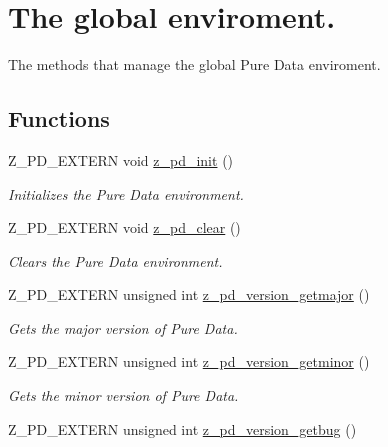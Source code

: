 \hypertarget{group__enviroment}{\section{The global enviroment.}
\label{group__enviroment}
}


The methods that manage the global Pure Data enviroment.  


\subsection*{Functions}
\begin{DoxyCompactItemize}
\item 
Z\-\_\-\-P\-D\-\_\-\-E\-X\-T\-E\-R\-N void \hyperlink{group__enviroment_ga23019af63ef9f9630662e85049bfe0db}{z\-\_\-pd\-\_\-init} ()
\begin{DoxyCompactList}\small\item\em Initializes the Pure Data environment. \end{DoxyCompactList}\item 
Z\-\_\-\-P\-D\-\_\-\-E\-X\-T\-E\-R\-N void \hyperlink{group__enviroment_ga6d011dabf164cfa344c98a02b969e583}{z\-\_\-pd\-\_\-clear} ()
\begin{DoxyCompactList}\small\item\em Clears the Pure Data environment. \end{DoxyCompactList}\item 
\hypertarget{group__enviroment_ga8a9894b327f19c0b1f82a755e555085e}{Z\-\_\-\-P\-D\-\_\-\-E\-X\-T\-E\-R\-N unsigned int \hyperlink{group__enviroment_ga8a9894b327f19c0b1f82a755e555085e}{z\-\_\-pd\-\_\-version\-\_\-getmajor} ()}\label{group__enviroment_ga8a9894b327f19c0b1f82a755e555085e}

\begin{DoxyCompactList}\small\item\em Gets the major version of Pure Data. \end{DoxyCompactList}\item 
\hypertarget{group__enviroment_ga73f86485fd6451f2215ce34414ed3964}{Z\-\_\-\-P\-D\-\_\-\-E\-X\-T\-E\-R\-N unsigned int \hyperlink{group__enviroment_ga73f86485fd6451f2215ce34414ed3964}{z\-\_\-pd\-\_\-version\-\_\-getminor} ()}\label{group__enviroment_ga73f86485fd6451f2215ce34414ed3964}

\begin{DoxyCompactList}\small\item\em Gets the minor version of Pure Data. \end{DoxyCompactList}\item 
\hypertarget{group__enviroment_ga5679023180123b7e1a1bcbf45b177a86}{Z\-\_\-\-P\-D\-\_\-\-E\-X\-T\-E\-R\-N unsigned int \hyperlink{group__enviroment_ga5679023180123b7e1a1bcbf45b177a86}{z\-\_\-pd\-\_\-version\-\_\-getbug} ()}\label{group__enviroment_ga5679023180123b7e1a1bcbf45b177a86}


\end{DoxyCompactItemize}
